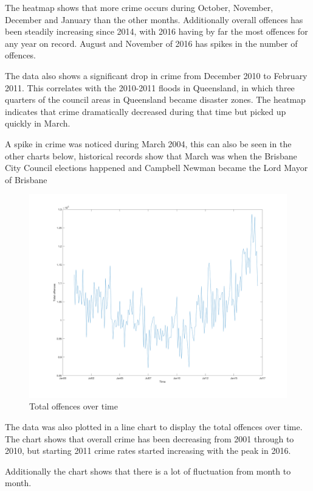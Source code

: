 \documentclass[]{article}
\begin{document}
The heatmap shows that more crime occurs during October, November, December and January than the other months. 
Additionally overall offences has been steadily increasing since 2014, with
2016 having by far the most offences for any year on record.
August and November of 2016 has spikes in the number of offences.

The data also shows a significant drop in crime from December 2010 to February 2011.
This correlates with the 2010-2011 floods in Queensland, in which three quarters of the council areas
in Queensland became disaster zones\cite{noauthor_201011_2017}.
The heatmap indicates that crime dramatically decreased during that time but picked up quickly in March.

A spike in crime was noticed during March 2004, this can also be seen in the other charts below, historical records show that March was when the Brisbane City Council elections happened and Campbell Newman became the Lord Mayor of Brisbane\cite{noauthor_2004_2017}

\begin{figure}[H]
    \caption{Total offences over time}
    \centering
    \includegraphics[width=\linewidth]{../images/crime_over_time}
\end{figure}

The data was also plotted in a line chart to display the total offences over time.
The chart shows that overall crime has been decreasing from 2001 through to 2010, 
but starting 2011 crime rates started increasing with the peak in 2016.

Additionally the chart shows that there is a lot of fluctuation from month to month. 
\end{document}
